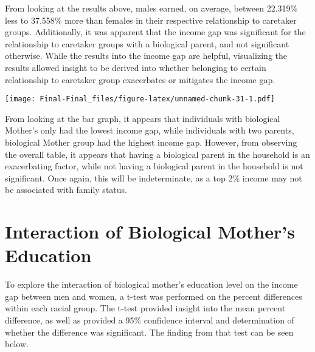 \documentclass[
]{article}
\begin{document}
From looking at the results above, males earned, on average, between
22.319\% less to 37.558\% more than females in their respective
relationship to caretaker groups. Additionally, it was apparent that the
income gap was significant for the relationship to caretaker groups with
a biological parent, and not significant otherwise. While the results
into the income gap are helpful, visualizing the results allowed insight
to be derived into whether belonging to certain relationship to
caretaker group exacerbates or mitigates the income gap.

\texttt{[image: Final-Final\_files/figure-latex/unnamed-chunk-31-1.pdf]}

From looking at the bar graph, it appears that individuals with
biological Mother's only had the lowest income gap, while individuals
with two parents, biological Mother group had the highest income gap.
However, from observing the overall table, it appears that having a
biological parent in the household is an exacerbating factor, while not
having a biological parent in the household is not significant. Once
again, this will be indeterminate, as a top 2\% income may not be
associated with family status.

\hypertarget{interaction-of-biological-mothers-education}{%
\section{Interaction of Biological Mother's
Education}\label{interaction-of-biological-mothers-education}}

To explore the interaction of biological mother's education level on the
income gap between men and women, a t-test was performed on the percent
differences within each racial group. The t-test provided insight into
the mean percent difference, as well as provided a 95\% confidence
interval and determination of whether the difference was significant.
The finding from that test can be seen below.
\end{document}
